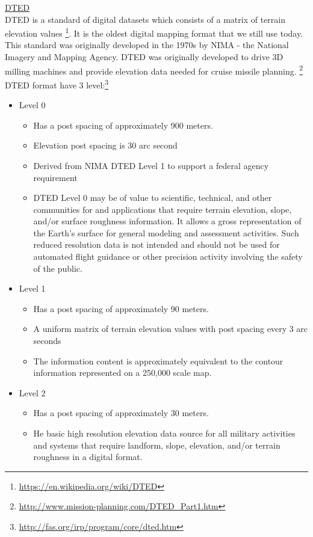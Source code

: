 \documentclass[11pt]{article}
\begin{document}
\noindent \underline{DTED}\\ 
DTED is a standard of digital datasets which consists of a matrix of terrain elevation values \footnote{\url{https://en.wikipedia.org/wiki/DTED}}. It is the oldest digital mapping format that we still use today. This standard was originally developed in the 1970s by NIMA - the National Imagery and Mapping Agency. DTED was originally developed to drive 3D milling machines and provide elevation data needed for cruise missile planning. \footnote{\url{http://www.mission-planning.com/DTED_Part1.htm}}\\ 
DTED format have 3 level:\footnote{\url{http://fas.org/irp/program/core/dted.htm}}
\begin{itemize}
\item Level 0 
\begin{itemize}
\item Has a post spacing of approximately 900 meters.
\item Elevation post spacing is 30 arc second 
\item Derived from NIMA DTED Level 1 to support a federal agency requirement
\item DTED Level 0 may be of value to scientific, technical, and other communities for and applications that require terrain elevation, slope, and/or surface roughness information. It allows a gross representation of the Earth's surface for general modeling and assessment activities. Such reduced resolution data is not intended and should not be used for automated flight guidance or other precision activity involving the safety of the public.
\end{itemize}
\item Level 1 
\begin{itemize}
\item Has a post spacing of approximately 90 meters.
\item A uniform matrix of terrain elevation values with post spacing every 3 arc seconds
\item The information content is approximately equivalent to the contour information represented on a 250,000 scale map.
\end{itemize}
\item Level 2 
\begin{itemize}
\item Has a post spacing of approximately 30 meters. 
\item He basic high resolution elevation data source for all military activities and systems that require landform, slope, elevation, and/or terrain roughness in a digital format.
\end{itemize}
\end{itemize}
\end{document}
